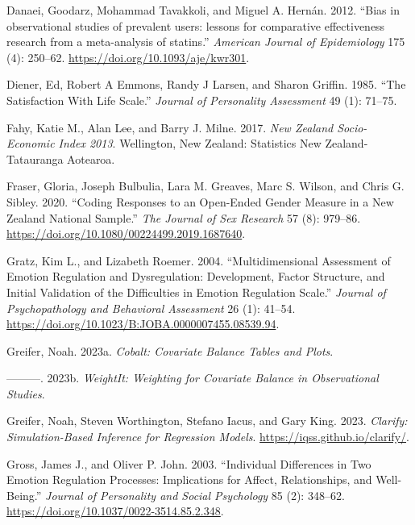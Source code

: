 \documentclass[
  singlecolumn]{report}
\newlength{\cslhangindent}
\newlength{\cslentryspacingunit} %
\newenvironment{CSLReferences}[2] %
 {%
  \setlength{\parindent}{0pt}
  \ifodd #1
  \let\oldpar\par
  \def\par{\hangindent=\cslhangindent\oldpar}
  \fi
  \setlength{\parskip}{#2\cslentryspacingunit}
 }%
 {}
\begin{document}
\begin{CSLReferences}{1}{0}
\leavevmode{}%
Danaei, Goodarz, Mohammad Tavakkoli, and Miguel A. Hernán. 2012. {``Bias
in observational studies of prevalent users: lessons for comparative
effectiveness research from a meta-analysis of statins.''}
\emph{American Journal of Epidemiology} 175 (4): 250--62.
\url{https://doi.org/10.1093/aje/kwr301}.

\leavevmode{}%
Diener, Ed, Robert A Emmons, Randy J Larsen, and Sharon Griffin. 1985.
{``The Satisfaction With Life Scale.''} \emph{Journal of Personality
Assessment} 49 (1): 71--75.

\leavevmode{}%
Fahy, Katie M., Alan Lee, and Barry J. Milne. 2017. \emph{New Zealand
Socio-Economic Index 2013}. Wellington, New Zealand: Statistics New
Zealand-Tatauranga Aotearoa.

\leavevmode{}%
Fraser, Gloria, Joseph Bulbulia, Lara M. Greaves, Marc S. Wilson, and
Chris G. Sibley. 2020. {``Coding Responses to an Open-Ended Gender
Measure in a New Zealand National Sample.''} \emph{The Journal of Sex
Research} 57 (8): 979--86.
\url{https://doi.org/10.1080/00224499.2019.1687640}.

\leavevmode{}%
Gratz, Kim L., and Lizabeth Roemer. 2004. {``Multidimensional Assessment
of Emotion Regulation and Dysregulation: Development, Factor Structure,
and Initial Validation of the Difficulties in Emotion Regulation
Scale.''} \emph{Journal of Psychopathology and Behavioral Assessment} 26
(1): 41--54. \url{https://doi.org/10.1023/B:JOBA.0000007455.08539.94}.

\leavevmode{}%
Greifer, Noah. 2023a. \emph{Cobalt: Covariate Balance Tables and Plots}.

\leavevmode{}%
---------. 2023b. \emph{WeightIt: Weighting for Covariate Balance in
Observational Studies}.

\leavevmode{}%
Greifer, Noah, Steven Worthington, Stefano Iacus, and Gary King. 2023.
\emph{Clarify: Simulation-Based Inference for Regression Models}.
\url{https://iqss.github.io/clarify/}.

\leavevmode{}%
Gross, James J., and Oliver P. John. 2003. {``Individual Differences in
Two Emotion Regulation Processes: Implications for Affect,
Relationships, and Well-Being.''} \emph{Journal of Personality and
Social Psychology} 85 (2): 348--62.
\url{https://doi.org/10.1037/0022-3514.85.2.348}.


\end{CSLReferences}
\end{document}
